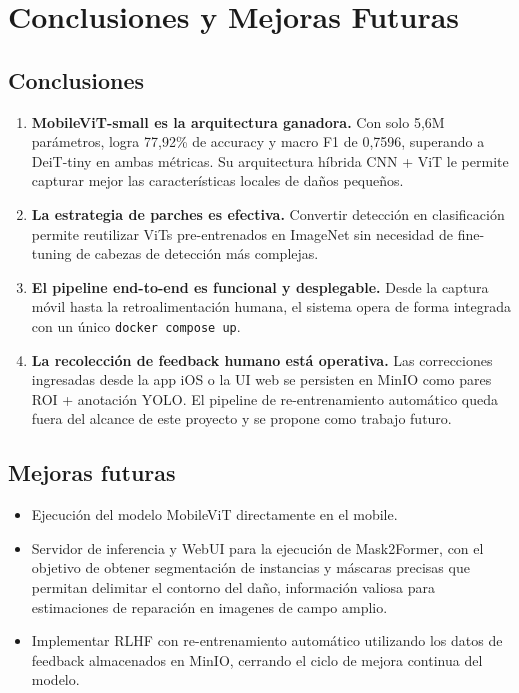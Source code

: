 \documentclass[12pt,a4paper]{article}
\begin{document}
\section{Conclusiones y Mejoras Futuras}

\subsection{Conclusiones}

\begin{enumerate}
  \item \textbf{MobileViT-small es la arquitectura ganadora.} Con solo 5,6M parámetros,
        logra 77,92\% de accuracy y macro F1 de 0,7596, superando a DeiT-tiny en ambas
        métricas. Su arquitectura híbrida CNN + ViT le permite capturar mejor las
        características locales de daños pequeños.

  \item \textbf{La estrategia de parches es efectiva.} Convertir detección en clasificación
        permite reutilizar ViTs pre-entrenados en ImageNet sin necesidad de fine-tuning
        de cabezas de detección más complejas.

  \item \textbf{El pipeline end-to-end es funcional y desplegable.} Desde la captura
        móvil hasta la retroalimentación humana, el sistema opera de forma integrada
        con un único \texttt{docker compose up}.

  \item \textbf{La recolección de feedback humano está operativa.} Las correcciones
        ingresadas desde la app iOS o la UI web se persisten en MinIO como pares
        ROI + anotación YOLO. El pipeline de re-entrenamiento automático queda fuera
        del alcance de este proyecto y se propone como trabajo futuro.
\end{enumerate}


\subsection{Mejoras futuras}

\begin{itemize}
  \item Ejecución del modelo MobileViT directamente en el mobile.
  \item Servidor de inferencia y WebUI para la ejecución de Mask2Former, con el objetivo de obtener segmentación de instancias y máscaras precisas que permitan delimitar el contorno del daño, información valiosa para estimaciones de reparación en imagenes de campo amplio.
  \item Implementar RLHF con re-entrenamiento automático utilizando los datos de feedback almacenados en MinIO, cerrando el ciclo de mejora continua del modelo.
\end{itemize}
\end{document}
